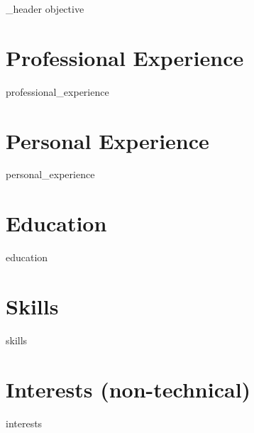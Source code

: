 \documentclass[letter,10pt]{article}
\author{Dillon L. Stadther}
\begin{document}
{_header}
{objective}

\section{Professional Experience}
{professional_experience}

\section{Personal Experience}
{personal_experience}

\section{Education}
{education}

\section{Skills}
{skills}


\section{Interests (non-technical)}
{interests}
\end{document}
